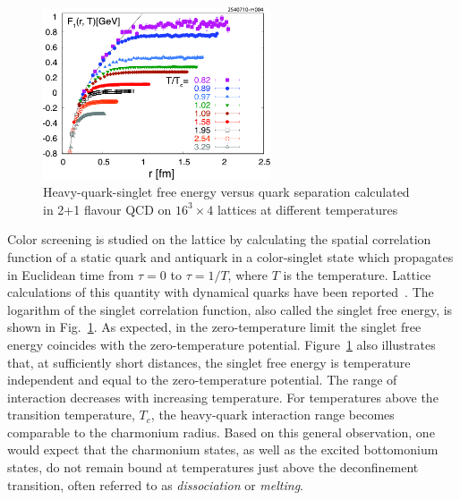 \begin{figure}[h]
   \begin{center}
      \includegraphics[width=0.6\textwidth]{Figures/LattSingEnergy.pdf}
      \caption{Heavy-quark-singlet free energy versus quark separation 
               calculated in 2+1 flavour QCD
              on $16^3 \times 4$ lattices at different 
               temperatures~\cite{Petreczky:2009ip,Petreczky:2010yn}  
               }
      \label{Fig:LatticeSingEner}
   \end{center}
\end{figure}
Color screening is studied on the lattice by 
calculating the spatial correlation function of a static quark and
antiquark in a color-singlet state which propagates in Euclidean time 
from $\tau=0$ to $\tau=1/T$, where $T$ is the temperature.
Lattice calculations of this quantity with dynamical quarks have been
reported~\cite{Kaczmarek:2002mc,Petreczky:2009ip,Petreczky:2010yn}.
The logarithm of the singlet
correlation function, also called the singlet free energy,
is shown in Fig.~\ref{Fig:LatticeSingEner}. 
As expected, in the zero-temperature limit the
singlet free energy coincides with the zero-temperature potential. 
Figure~\ref{Fig:LatticeSingEner} also illustrates that,
at sufficiently short distances, the singlet free energy is
temperature independent and equal to the zero-temperature potential. 
The range of interaction decreases with increasing temperature.  For 
temperatures above the transition temperature, $T_c$, the heavy-quark 
interaction range becomes comparable to the charmonium radius. Based on 
this general observation, one would expect that the charmonium
states, as well as the excited bottomonium states, do not remain bound at
temperatures just above the deconfinement transition, often referred to as 
{\em dissociation} or {\em melting}. 

